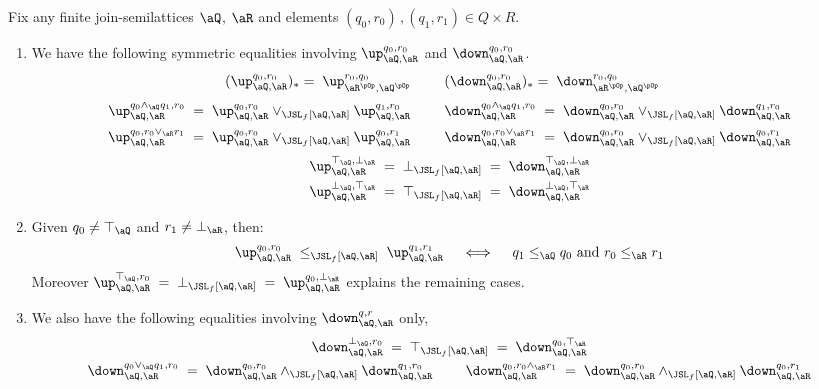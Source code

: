 \documentclass{article}
\begin{document}
\begin{lemma}
\label{lem:special_jsl_morphisms}
\item
Fix any finite join-semilattices $\aQ$, $\aR$ and elements $(q_0,r_0)\,,(q_1,r_1) \in Q \times R$.
\begin{enumerate}

\item
We have the following symmetric equalities involving $\up_{\aQ,\aR}^{q_0,r_0}$ and $\down_{\aQ,\aR}^{q_0,r_0}$.
\[
\begin{tabular}{rll}
$(\up_{\aQ,\aR}^{q_0,r_0})_* = \; \up_{\aR^{\pOp},\aQ^{\pOp}}^{r_0,q_0}$
&&
$(\down_{\aQ,\aR}^{q_0,r_0})_* = \; \down_{\aR^{\pOp},\aQ^{\pOp}}^{r_0,q_0}$
\\[2ex]
$\up_{\aQ,\aR}^{q_0 \land_\aQ q_1, r_0}
\; = \;
\up_{\aQ,\aR}^{q_0, r_0} \lor_{\JSL_f[\aQ,\aR]} \up_{\aQ,\aR}^{q_1, r_0}$
&&
$\down_{\aQ,\aR}^{q_0 \land_\aQ q_1, r_0}
\; = \;
\down_{\aQ,\aR}^{q_0, r_0} \lor_{\JSL_f[\aQ,\aR]} \down_{\aQ,\aR}^{q_1, r_0}$
\\[1.5ex]
$\up_{\aQ,\aR}^{q_0, r_0 \lor_\aR r_1}
\; = \;
\up_{\aQ,\aR}^{q_0, r_0} \lor_{\JSL_f[\aQ,\aR]} \up_{\aQ,\aR}^{q_0, r_1}$
&&
$\down_{\aQ,\aR}^{q_0, r_0 \lor_\aR r_1}
\; = \;
\down_{\aQ,\aR}^{q_0, r_0} \lor_{\JSL_f[\aQ,\aR]} \down_{\aQ,\aR}^{q_0, r_1}$
\end{tabular}
\]
\[
\begin{tabular}{c}
$ \up_{\aQ,\aR}^{\top_\aQ,\bot_\aR} \;
= \; \bot_{\JSL_f[\aQ,\aR]} \;
= \; \down_{\aQ,\aR}^{\top_\aQ,\bot_\aR}$
\\[1ex]
$\up_{\aQ,\aR}^{\bot_\aQ,\top_\aR} \;
= \; \top_{\JSL_f[\aQ,\aR]} \;
= \; \down_{\aQ,\aR}^{\bot_\aQ,\top_\aR}$
\end{tabular}
\]

\item
Given $q_0 \neq \top_\aQ$ and $r_1 \neq \bot_\aR$, then:
\[
\up_{\aQ,\aR}^{q_0,r_0} \; \leq_{\JSL_f[\aQ,\aR]} \; \up_{\aQ,\aR}^{q_1,r_1}
\quad\iff\quad q_1 \leq_\aQ q_0 \text{ and } r_0 \leq_\aR r_1
\]
Moreover $\up_{\aQ,\aR}^{\top_\aQ,r_0} \;
= \; \bot_{\JSL_f[\aQ,\aR]} \; = \; \up_{\aQ,\aR}^{q_0,\bot_\aR} $ explains the remaining cases.

\item
We also have the following equalities involving $\down_{\aQ,\aR}^{q,r}$ only,
\[
\begin{tabular}{c}
$\down_{\aQ,\aR}^{\bot_\aQ, r_0}\;
= \; \top_{\JSL_f[\aQ,\aR]} \;
= \; \down_{\aQ,\aR}^{q_0,\top_\aR} $
\\[1ex]
$\down_{\aQ,\aR}^{q_0 \lor_\aQ q_1, r_0}
\; = \;
\down_{\aQ,\aR}^{q_0, r_0} \land_{\JSL_f[\aQ,\aR]} \down_{\aQ,\aR}^{q_1, r_0}$
\qquad
$\down_{\aQ,\aR}^{q_0, r_0 \land_\aR r_1}
\; = \;
\down_{\aQ,\aR}^{q_0, r_0} \land_{\JSL_f[\aQ,\aR]} \down_{\aQ,\aR}^{q_0, r_1}$
\end{tabular}
\]



\end{enumerate}
\end{lemma}
\end{document}
